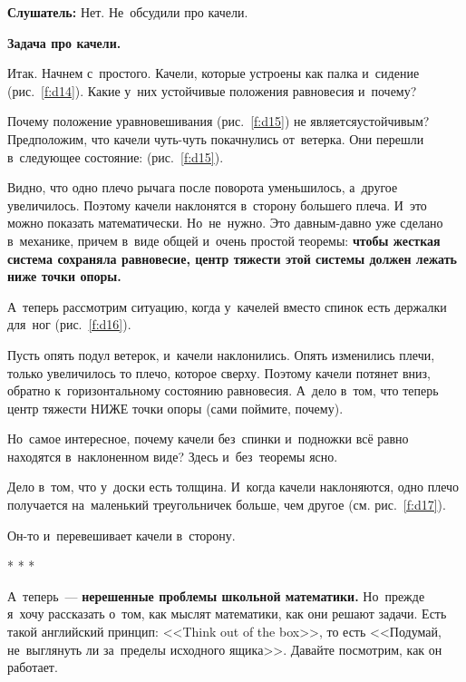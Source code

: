 \textbf{Слушатель:} Нет. Не~обсудили про качели.

\textbf{Задача про качели.}

Итак. Начнем с~простого. Качели, которые устроены как палка и~сидение (рис.~\ref{f:d14}).
Какие у~них устойчивые положения равновесия и~почему?


Почему положение уравновешивания (рис.~\ref{f:d15}) не является\linebreak устойчивым?
Предположим, что качели чуть-чуть покачнулись от~ветерка. Они перешли в~следующее состояние: (рис.~\ref{f:d15}).


Видно, что одно плечо рычага после поворота уменьшилось, а~другое увеличилось. Поэтому качели
наклонятся в~сторону большего плеча. И~это можно показать математически. Но~не~нужно. Это
давным-давно уже сделано в~механике, причем в~виде общей и~очень простой теоремы: \textbf{чтобы жесткая
система сохраняла равновесие, центр тяжести этой системы должен лежать ниже точки опоры.}

А~теперь рассмотрим ситуацию, когда у~качелей вместо спинок есть держалки для~ног (рис.~\ref{f:d16}).


Пусть опять подул ветерок, и~качели наклонились. Опять изменились плечи, только увеличилось то
плечо, которое сверху. Поэтому качели потянет вниз, обратно к~горизонтальному состоянию равновесия.
А~дело в~том, что теперь центр тяжести НИЖЕ точки опоры (сами поймите, почему).

Но~самое интересное, почему качели без~спинки и~подножки всё равно находятся в~наклоненном виде?
Здесь и~без~теоремы ясно.

Дело в~том, что у~доски есть толщина. И~когда качели наклоняются, одно плечо получается
на~маленький треугольничек больше, чем другое (см. рис.~\ref{f:d17}).


Он-то и~перевешивает качели в~сторону.

\centerline{* * *}

А~теперь~--- \textbf{нерешенные проблемы школьной математики.} Но~прежде я~хочу рассказать о~том, как мыслят
математики, как они решают задачи. Есть такой английский принцип: <<Think out of the box>>, то есть
<<Подумай, не~выглянуть ли за~пределы исходного ящика>>. Давайте посмотрим, как он работает.

